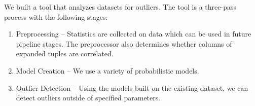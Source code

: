 We built a tool that analyzes datasets for outliers.
The tool is a three-pass process with the following stages:
\begin{enumerate}
\item Preprocessing -- Statistics are collected on data which can be used in future pipeline stages. The preprocessor also determines whether columns of expanded tuples are correlated.
\item Model Creation -- We use a variety of probabilistic models. 
\item Outlier Detection -- Using the models built on the existing dataset, we can detect outliers outside of specified parameters.
\end{enumerate}


